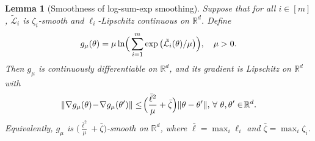 \documentclass[10pt,a4paper]{amsart}
\newtheorem{lemma}{Lemma}
\renewcommand{\footnote}[1]{}
\begin{document}
\begin{lemma}[Smoothness of log-sum-exp smoothing]\label{lem:lse_smoothness}
Suppose that for all $i\in[m]$,
$\tilde{\mathcal{L}}_i$ is $\zeta_i$-smooth and $\ell_i$-Lipschitz continuous on $\mathbb{R}^d$.
Define
\begin{align}
    g_{\mu}(\theta)=\mu\ln\!\Big(\sum_{i=1}^{m}\exp\big(\tilde{\mathcal{L}}_i(\theta)/\mu\big)\Big),
    \quad \mu>0 \notag.
\end{align}
Then $g_{\mu}$ is continuously differentiable on $\mathbb{R}^d$, and its gradient is Lipschitz on $\mathbb{R}^d$ with
\begin{align}
    \|\nabla g_{\mu}(\theta)\!-\!\nabla g_{\mu}(\theta')\|
    \le\!
    \Big(\frac{\bar{\ell}^2}{\mu}+\bar{\zeta}\Big)
    \|\theta-\theta'\|,\, \forall~\theta,\theta'\in \!\mathbb{R}^d \notag.
\end{align} %
Equivalently, $g_{\mu}$ is $\Big(\frac{\bar{\ell}^2}{\mu}+\bar{\zeta}\Big)$-smooth on $\mathbb{R}^d$, where $\bar{\ell}=\max_{i}\ell_i$ and $\bar{\zeta}=\max_{i}\zeta_i$.
\end{lemma}
\end{document}
